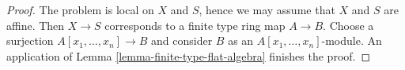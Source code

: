\documentclass[10pt,a4paper]{amsart}
\theoremstyle{plain}
\theoremstyle{definition}
\theoremstyle{remark}
\numberwithin{equation}{subsection}
\begin{document}
\begin{proof}
The problem is local on $X$ and $S$, hence we may assume that
$X$ and $S$ are affine. Then $X \to S$ corresponds to a finite type
ring map $A \to B$. Choose a surjection $A[x_1, \ldots, x_n] \to B$
and consider $B$ as an $A[x_1, \ldots, x_n]$-module. An application of
Lemma \ref{lemma-finite-type-flat-algebra}
finishes the proof.
\end{proof}
\end{document}
